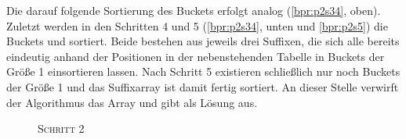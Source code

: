Die darauf folgende Sortierung des Buckets  erfolgt analog (\cref{bpr:p2s34}, oben).
Zuletzt werden in den Schritten 4 und 5 (\cref{bpr:p2s34}, unten und \cref{bpr:p2s5}) die Buckets  und  sortiert. Beide bestehen aus jeweils drei Suffixen, die sich alle bereits eindeutig anhand der Positionen in der nebenstehenden Tabelle in Buckets der Größe 1 einsortieren lassen. Nach Schritt 5 existieren schließlich nur noch Buckets der Größe 1 und das Suffixarray ist damit fertig sortiert. An dieser Stelle verwirft der Algorithmus das Array \bptr und gibt \sa als Lösung aus.
\begin{figure}[H]
    {\centering\begin{minipage}{\textwidth}
        {\large \textsc{Schritt 2}}\par\medskip
        \hfill
        \\

\end{minipage}}
\end{figure}
